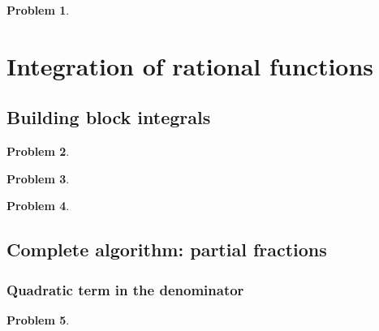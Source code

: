 \documentclass{article}
\newtheorem{problem}{Problem}
\begin{document}
\begin{problem}

\end{problem}



\section{Integration of rational functions}
\subsection{Building block integrals}
\begin{problem}

\end{problem}


\begin{problem}

\end{problem}


\begin{problem}

\end{problem}


\subsection{Complete algorithm: partial fractions}
\subsubsection{Quadratic term in the denominator}
\begin{problem}

\end{problem}

\end{document}
